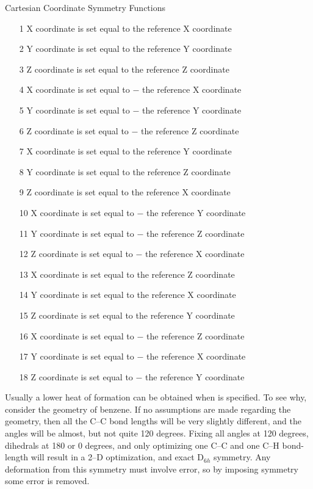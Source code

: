 \begin{table}
\caption{\label{xsym} Cartesian Coordinate Symmetry Functions}
\begin{makeimage}
\end{makeimage}
\begin{enumerate}
\item[1] X coordinate is set equal to   the reference X coordinate
\item[2] Y coordinate is set equal to   the reference Y coordinate
\item[3] Z coordinate is set equal to   the reference Z coordinate
\item[4] X coordinate is set equal to $-$ the reference X coordinate
\item[5] Y coordinate is set equal to $-$ the reference Y coordinate
\item[6] Z coordinate is set equal to $-$ the reference Z coordinate
\item[7] X coordinate is set equal to   the reference Y coordinate
\item[8] Y coordinate is set equal to   the reference Z coordinate
\item[9] Z coordinate is set equal to   the reference X coordinate
\item[10] X coordinate is set equal to $-$ the reference Y coordinate
\item[11] Y coordinate is set equal to $-$ the reference Z coordinate
\item[12] Z coordinate is set equal to $-$ the reference X coordinate
\item[13] X coordinate is set equal to   the reference Z coordinate
\item[14] Y coordinate is set equal to   the reference X coordinate
\item[15] Z coordinate is set equal to   the reference Y coordinate
\item[16] X coordinate is set equal to $-$ the reference Z coordinate
\item[17] Y coordinate is set equal to $-$ the reference X coordinate
\item[18] Z coordinate is set equal to $-$ the reference Y coordinate
\end{enumerate}
\end{table}

Usually a lower heat of formation can be obtained when    is
specified.   To  see  why,  consider  the  geometry  of  benzene.   If no
assumptions are made regarding  the  geometry,  then  all  the  C--C bond
lengths  will  be very slightly different, and the angles will be almost, but
not quite 120 degrees.  Fixing all angles at 120  degrees,  dihedrals at  180
or 0 degrees, and only optimizing one C--C and one C--H bond-length will
result  in  a  2--D optimization, and exact D$_{6h}$ symmetry. Any deformation
from  this  symmetry  must  involve  error,  so  by imposing symmetry some
error is removed.


